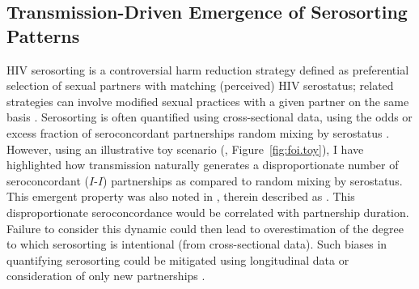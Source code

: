 \subsection{Transmission-Driven Emergence of Serosorting Patterns}\label{foi.disc.ss} %
HIV serosorting is a controversial harm reduction strategy defined as
preferential selection of sexual partners with matching (perceived) HIV serostatus;
related strategies can involve modified sexual practices with a given partner on the same basis
\cite{Heymer2010,Cassels2010,Cassels2013}.
Serosorting is often quantified using cross-sectional data,
using the odds or excess fraction of seroconcordant partnerships
\vs random mixing by serostatus \cite{Cassels2009,Wang2020}.
However, using an illustrative toy scenario (, Figure~\ref{fig:foi.toy}),
I have highlighted how transmission naturally generates
a disproportionate number of seroconcordant ($I$-$I$) partnerships
as compared to random mixing by serostatus.
This emergent property was also noted in \cite{Eames2002},
therein described as .
This disproportionate seroconcordance would be correlated with partnership duration.
Failure to consider this dynamic could then lead to
overestimation of the degree to which serosorting is intentional (from cross-sectional data).
Such biases in quantifying serosorting could be mitigated using longitudinal data
or consideration of only new partnerships \cite{Kim2020}.

